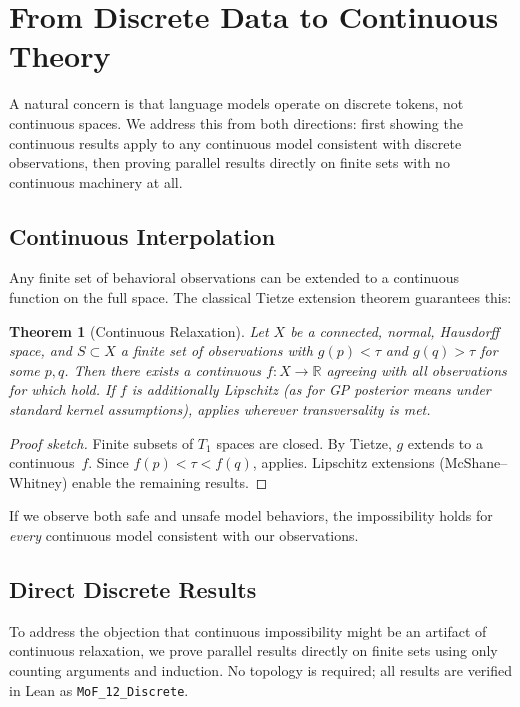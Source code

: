 \documentclass[11pt]{article}
\newtheorem{theorem}{Theorem}[section]
\newcommand{\R}{\mathbb{R}}
\begin{document}
\section{From Discrete Data to Continuous Theory}
\label{sec:bridge}

A natural concern is that language models operate on discrete tokens,
not continuous spaces. We address this from both directions: first
showing the continuous results apply to any continuous model consistent
with discrete observations, then proving parallel results directly on
finite sets with no continuous machinery at all.

\subsection{Continuous Interpolation}

Any finite set of behavioral observations can be extended to a
continuous function on the full space. The classical Tietze extension
theorem guarantees this:

\begin{theorem}[Continuous Relaxation]
\label{thm:tietze}
Let $X$ be a connected, normal, Hausdorff space, and $S \subset X$ a
finite set of observations with $g(p) < \tau$ and $g(q) > \tau$ for
some $p, q$. Then there exists a continuous $f\colon X \to \R$ agreeing
with all observations for which  hold.
If $f$ is additionally Lipschitz (as for GP posterior means under
standard kernel assumptions),  applies wherever
transversality is met.
\end{theorem}

\begin{proof}[Proof sketch]
Finite subsets of $T_1$ spaces are closed. By Tietze, $g$ extends to a
continuous~$f$. Since $f(p) < \tau < f(q)$,  applies.
Lipschitz extensions (McShane--Whitney) enable the remaining results.
\end{proof}

If we observe both safe and unsafe model behaviors, the
impossibility holds for \emph{every} continuous model consistent with our observations.

\subsection{Direct Discrete Results}

To address the objection that continuous impossibility might be an
artifact of continuous relaxation, we prove parallel results directly
on finite sets using only counting arguments and induction. No
topology is required; all results are verified in Lean as
\texttt{MoF\_12\_Discrete}.
\end{document}
